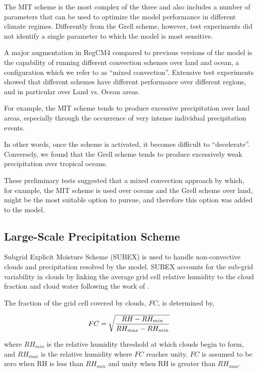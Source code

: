 {\begin{enumerate}
The MIT scheme is the most complex of the three and also includes a number of
parameters that can be used to optimize the model performance in different
climate regimes. Differently from the Grell scheme, however, test experiments
did not identify a single parameter to which the model is most sensitive.
\end{enumerate}

A major augmentation in \ac{RegCM4} compared to previous versions of the model
is the capability of running different convection schemes over land and ocean,
a configuration which we refer to as “mixed convection”. Extensive test
experiments showed that different schemes have different performance over
different regions, and in particular over Land vs. Ocean areas.

For example, the MIT scheme tends to produce excessive precipitation over land
areas, especially through the occurrence of very intense individual
precipitation events.

In other words, once the scheme is activated, it becomes difficult to
“decelerate”. Conversely, we found that the Grell scheme tends to produce
excessively weak precipitation over tropical oceans.

These preliminary tests suggested that a mixed convection approach by which,
for example, the MIT scheme is used over oceans and the Grell scheme over
land, might be the most suitable option to pursue, and therefore this option
was added to the model.

\subsection{Large-Scale Precipitation Scheme}

Subgrid Explicit Moisture
Scheme (SUBEX) is used to handle non-convective clouds and precipitation
resolved by the model.  SUBEX accounts for the sub-grid variability in clouds
by linking the average grid cell relative
humidity to the cloud fraction and cloud water following the work of
\cite{Sundqvist_89}.  

The fraction of the grid cell covered by clouds, $FC$, is determined by,

\begin{eqnarray}
FC = \sqrt{ { {RH - RH_{min}} \over {RH_{max} - RH_{min} }} }
\end{eqnarray}

where ${RH_{min}}$ is the relative humidity threshold at which clouds
begin to form, and ${RH_{max}}$ is the relative humidity where $FC$ reaches
unity.  $FC$ is assumed to be zero when RH is less than ${RH_{min}}$ and unity
when RH is greater than ${RH_{max}}$.  

}
